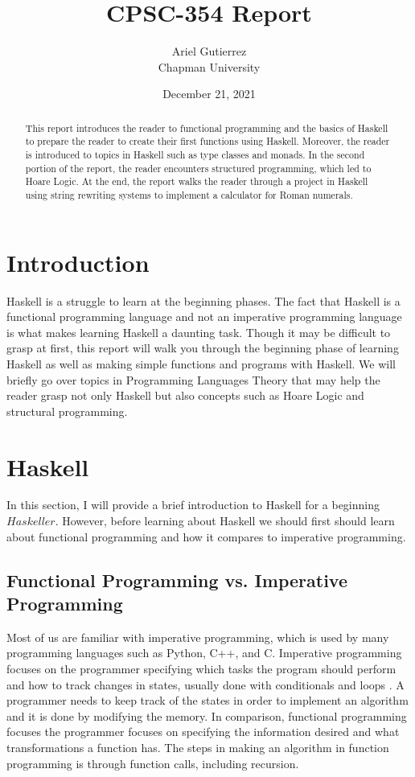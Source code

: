 \documentclass{article}
\title{CPSC-354 Report}
\author{Ariel Gutierrez \\ Chapman University}
\date{December 21, 2021}
\begin{document}
\maketitle

\begin{abstract}
This report introduces the reader to functional programming and the basics of Haskell to prepare the reader to create their first functions using Haskell. Moreover, the reader is introduced to topics in Haskell such as type classes and monads. In the second portion of the report, the reader encounters structured programming, which led to Hoare Logic. At the end, the report walks the reader through a project in Haskell using string rewriting systems to implement a calculator for Roman numerals.
\end{abstract}

\tableofcontents

\section{Introduction}\label{intro}

Haskell is a struggle to learn at the beginning phases. The fact that Haskell is a functional programming language and not an imperative programming language is what makes learning Haskell a daunting task. Though it may be difficult to grasp at first, this report will walk you through the beginning phase of learning Haskell as well as making simple functions and programs with Haskell. We will briefly go over topics in Programming Languages Theory that may help the reader grasp not only Haskell but also concepts such as Hoare Logic and structural programming.


\section{Haskell}\label{haskell}
\noindent In this section, I will provide a brief introduction to Haskell for a beginning $Haskeller$. However, before learning about Haskell we should first should learn about functional programming and how it compares to imperative programming.
\subsection{Functional Programming vs. Imperative Programming}
Most of us are familiar with imperative programming, which is used by many programming languages such as Python, C++, and C. Imperative programming focuses on the programmer specifying which tasks the program should perform and how to track changes in states, usually done with conditionals and loops \cite{1}. A programmer needs to keep track of the states in order to implement an algorithm and it is done by modifying the memory. In comparison, functional programming focuses the programmer focuses on specifying the information desired and what transformations a function has. The steps in making an algorithm in function programming is through function calls, including recursion.
\end{document}
